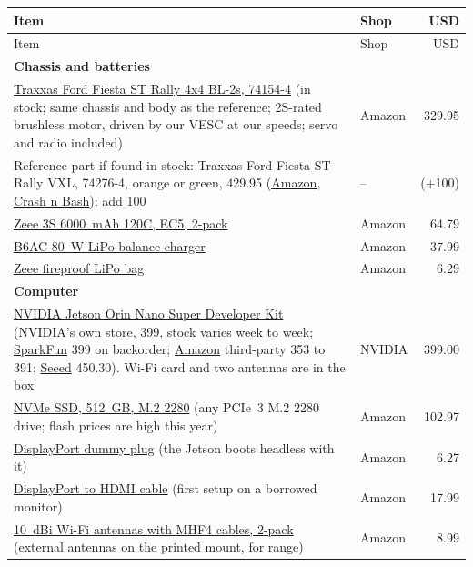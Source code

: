 \documentclass[11pt,a4paper]{article}
\begin{document}
\small
\begin{longtable}{p{11.6cm}lr}
\toprule
Item & Shop & USD \\
\midrule
\endfirsthead
\toprule
Item & Shop & USD \\
\midrule
\endhead
\multicolumn{3}{l}{\textbf{Chassis and batteries}} \\
\href{https://www.amazon.com/dp/B0CRHYCNVZ}{Traxxas Ford Fiesta ST Rally 4x4 BL-2s, 74154-4} (in stock; same chassis and body as the reference; 2S-rated brushless motor, driven by our VESC at our speeds; servo and radio included) & Amazon & 329.95 \\
\quad Reference part if found in stock: Traxxas Ford Fiesta ST Rally VXL, 74276-4, orange or green, 429.95 (\href{https://www.amazon.com/dp/B0D5M8D2R8}{Amazon}, \href{https://crashnbashhobbies.com/traxxas-74276-4-grn-ford-fiesta-rally-vxl-4x4.html}{Crash n Bash}); add 100 & -- & (+100) \\
\href{https://www.amazon.com/dp/B09N91KV46}{Zeee 3S 6000~mAh 120C, EC5, 2-pack} & Amazon & 64.79 \\
\href{https://www.amazon.com/dp/B0F6MP2Q5D}{B6AC 80~W LiPo balance charger} & Amazon & 37.99 \\
\href{https://www.amazon.com/dp/B0FWBMK87X}{Zeee fireproof LiPo bag} & Amazon & 6.29 \\
\multicolumn{3}{l}{\textbf{Computer}} \\
\href{https://marketplace.nvidia.com/en-us/enterprise/robotics-edge/jetson-orin-nano-super-developer-kit/}{NVIDIA Jetson Orin Nano Super Developer Kit} (NVIDIA's own store, 399, stock varies week to week; \href{https://www.sparkfun.com/nvidia-jetson-orin-nano-developer-kit.html}{SparkFun} 399 on backorder; \href{https://www.amazon.com/dp/B0BZJTQ5YP}{Amazon} third-party 353 to 391; \href{https://www.seeedstudio.com/NVIDIAr-Jetson-Orintm-Nano-Developer-Kit-p-5617.html}{Seeed} 450.30). Wi-Fi card and two antennas are in the box & NVIDIA & 399.00 \\
\href{https://www.amazon.com/dp/B07ZGJYLNL}{NVMe SSD, 512~GB, M.2 2280} (any PCIe~3 M.2 2280 drive; flash prices are high this year) & Amazon & 102.97 \\
\href{https://www.amazon.com/dp/B071CGCTMY}{DisplayPort dummy plug} (the Jetson boots headless with it) & Amazon & 6.27 \\
\href{https://www.amazon.com/dp/B0FMYG4CYS}{DisplayPort to HDMI cable} (first setup on a borrowed monitor) & Amazon & 17.99 \\
\href{https://www.amazon.com/dp/B07V1W759Z}{10~dBi Wi-Fi antennas with MHF4 cables, 2-pack} (external antennas on the printed mount, for range) & Amazon & 8.99 \\

\end{longtable}
\end{document}
